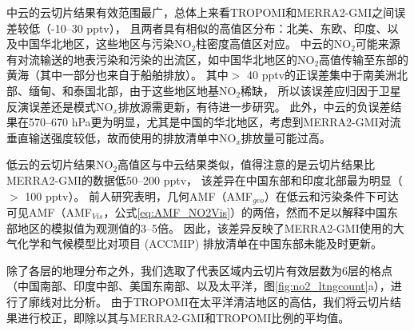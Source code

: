 中云的云切片结果有效范围最广，总体上来看TROPOMI和MERRA2-GMI之间误差较低（-10--30 pptv），
且两者具有相似的高值区分布：北美、东欧、印度、以及中国华北地区，这些地区与污染NO$_2$柱密度高值区对应。
中云的NO$_2$可能来源有对流输送的地表污染和污染的出流区，如中国华北地区的NO$_2$高值传输至东部的黄海（其中一部分也来自于船舶排放）。
其中$>$ 40 pptv的正误差集中于南美洲北部、缅甸、和泰国北部，由于这些地区地基NO$_2$稀缺，
所以该误差应归因于卫星反演误差还是模式NO$_x$排放源需更新，有待进一步研究。
此外，中云的负误差结果在570--670 hPa更为明显，尤其是中国的华北地区，考虑到MERRA2-GMI对流垂直输送强度较低，故而使用的排放清单中NO$_x$排放量可能过高\citep{Ziemke.2019}。

低云的云切片结果NO$_2$高值区与中云结果类似，值得注意的是云切片结果比MERRA2-GMI的数据低50--200 pptv，
该差异在中国东部和印度北部最为明显（$>$ 100 pptv）。
前人研究表明，几何AMF（AMF$_{geo}$）在低云和污染条件下可达可见AMF（AMF$_{Vis}$，公式\ref{eq:AMF_NO2Vis}）的两倍\citep{BelmonteRivas.2015}，然而不足以解释中国东部地区的模拟值为观测值的3--5倍。
因此，该差异反映了MERRA2-GMI使用的大气化学和气候模型比对项目 (ACCMIP) 排放清单在中国东部未能及时更新。

除了各层的地理分布之外，我们选取了代表区域内云切片有效层数为6层的格点（中国南部、印度中部、美国东南部、以及太平洋，图\ref{fig:no2_ltngcount}a），进行了廓线对比分析。
由于TROPOMI在太平洋清洁地区的高估，我们将云切片结果进行校正，即除以其与MERRA2-GMI和TROPOMI比例的平均值。


